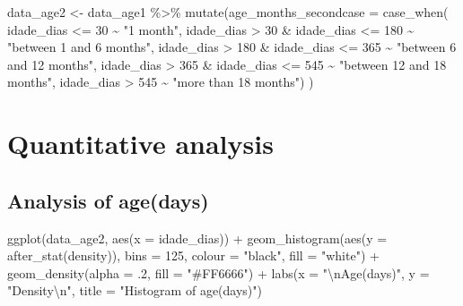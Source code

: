 \documentclass[
]{article}
\newenvironment{Shaded}{\begin{snugshade}}{\end{snugshade}}
\newcommand{\AttributeTok}[1]{\textcolor[rgb]{0.77,0.63,0.00}{#1}}
\newcommand{\DecValTok}[1]{\textcolor[rgb]{0.00,0.00,0.81}{#1}}
\newcommand{\FunctionTok}[1]{\textcolor[rgb]{0.00,0.00,0.00}{#1}}
\newcommand{\NormalTok}[1]{#1}
\newcommand{\OtherTok}[1]{\textcolor[rgb]{0.56,0.35,0.01}{#1}}
\newcommand{\SpecialCharTok}[1]{\textcolor[rgb]{0.00,0.00,0.00}{#1}}
\newcommand{\StringTok}[1]{\textcolor[rgb]{0.31,0.60,0.02}{#1}}
\renewenvironment{Shaded}{\begin{mdframed}[ backgroundcolor=shadecolor, linecolor = shadecolor, leftmargin=\dimexpr\leftmargin-2pt\relax, innerleftmargin=1.6pt, innertopmargin=5pt, skipabove=10pt,skipbelow=3pt ]}{\end{mdframed}}
\begin{document}
\begin{Shaded}
\begin{Highlighting}[]
\NormalTok{data\_age2 }\OtherTok{\textless{}{-}}\NormalTok{ data\_age1 }\SpecialCharTok{\%\textgreater{}\%}
  \FunctionTok{mutate}\NormalTok{(}\AttributeTok{age\_months\_secondcase =} \FunctionTok{case\_when}\NormalTok{(}
\NormalTok{    idade\_dias }\SpecialCharTok{\textless{}=} \DecValTok{30} \SpecialCharTok{\textasciitilde{}} \StringTok{"1 month"}\NormalTok{,}
\NormalTok{    idade\_dias }\SpecialCharTok{\textgreater{}} \DecValTok{30} \SpecialCharTok{\&}\NormalTok{ idade\_dias }\SpecialCharTok{\textless{}=} \DecValTok{180} \SpecialCharTok{\textasciitilde{}} \StringTok{"between 1 and 6 months"}\NormalTok{,}
\NormalTok{    idade\_dias }\SpecialCharTok{\textgreater{}} \DecValTok{180} \SpecialCharTok{\&}\NormalTok{ idade\_dias }\SpecialCharTok{\textless{}=} \DecValTok{365} \SpecialCharTok{\textasciitilde{}} \StringTok{"between 6 and 12 months"}\NormalTok{,}
\NormalTok{    idade\_dias }\SpecialCharTok{\textgreater{}} \DecValTok{365} \SpecialCharTok{\&}\NormalTok{ idade\_dias }\SpecialCharTok{\textless{}=} \DecValTok{545} \SpecialCharTok{\textasciitilde{}} \StringTok{"between 12 and 18 months"}\NormalTok{,}
\NormalTok{    idade\_dias }\SpecialCharTok{\textgreater{}} \DecValTok{545} \SpecialCharTok{\textasciitilde{}} \StringTok{"more than 18 months"}\NormalTok{) }
\NormalTok{    )}
\end{Highlighting}
\end{Shaded}

\hypertarget{quantitative-analysis}{%
\section{Quantitative analysis}\label{quantitative-analysis}}

\hypertarget{analysis-of-agedays}{%
\subsection{Analysis of age(days)}\label{analysis-of-agedays}}

\begin{Shaded}
\begin{Highlighting}[]
\FunctionTok{ggplot}\NormalTok{(data\_age2, }\FunctionTok{aes}\NormalTok{(}\AttributeTok{x =}\NormalTok{ idade\_dias)) }\SpecialCharTok{+} 
  \FunctionTok{geom\_histogram}\NormalTok{(}\FunctionTok{aes}\NormalTok{(}\AttributeTok{y =} \FunctionTok{after\_stat}\NormalTok{(density)), }
                 \AttributeTok{bins =} \DecValTok{125}\NormalTok{,}
                 \AttributeTok{colour =} \StringTok{"black"}\NormalTok{,}
                 \AttributeTok{fill =} \StringTok{"white"}\NormalTok{) }\SpecialCharTok{+}
  \FunctionTok{geom\_density}\NormalTok{(}\AttributeTok{alpha =}\NormalTok{ .}\DecValTok{2}\NormalTok{, }\AttributeTok{fill =} \StringTok{"\#FF6666"}\NormalTok{) }\SpecialCharTok{+}
  \FunctionTok{labs}\NormalTok{(}\AttributeTok{x =} \StringTok{"}\SpecialCharTok{\textbackslash{}n}\StringTok{Age(days)"}\NormalTok{,}
       \AttributeTok{y =} \StringTok{"Density}\SpecialCharTok{\textbackslash{}n}\StringTok{"}\NormalTok{,}
       \AttributeTok{title =} \StringTok{"Histogram of age(days)"}\NormalTok{)}
\end{Highlighting}
\end{Shaded}
\end{document}
